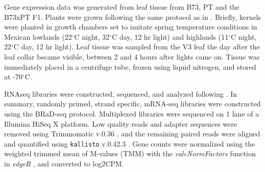 \documentclass[9pt,twocolumn,twoside]{BioRxiv}
\begin{document}
Gene expression data was generated from leaf tissue from B73, PT and the B73xPT F1. Plants were grown following the same protocol as in \cite{Crow2020-gene}. Briefly, kernels were planted in growth chambers set to imitate spring temperature conditions in Mexican lowlands (22$^{\circ}$C night, 32$^{\circ}$C day, 12 hr light) and highlands (11$^{\circ}$C night, 22$^{\circ}$C day, 12 hr light). Leaf tissue was sampled from the V3 leaf the day after the leaf collar became visible, between 2 and 4 hours after lights came on. Tissue was immediately placed in a centrifuge tube, frozen using liquid nitrogen, and stored at -70$^{\circ}$C.

RNAseq libraries were constructed, sequenced, and analyzed following \cite{Crow2020-gene}. In summary, randomly primed, strand specific, mRNA-seq libraries were constructed using the BRaD-seq \cite{townsley2015brad} protocol. Multiplexed libraries were sequenced on 1 lane of a Illumina HiSeq X platform. Low quality reads and adapter sequences were removed using Trimmomatic v.0.36 \cite{bolger2014trimmomatic}, and the remaining paired reads were aligned and quantified using \texttt{kallisto} v.0.42.3 \cite{bray2016near}. Gene counts were normalized using the weighted trimmed mean of M-values (TMM) with the \textit{calcNormFactors} function in \textit{edgeR} \cite{robinson2010edger}, and converted to log2CPM.
\end{document}
